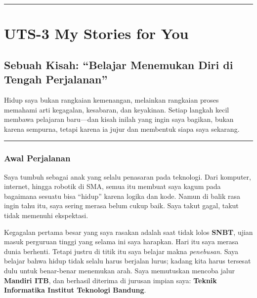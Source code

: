 \documentclass[
  letterpaper,
  DIV=11,
  numbers=noendperiod]{scrreprt}
\begin{document}
\begin{center}\rule{0.5\linewidth}{0.5pt}\end{center}


\chapter{UTS-3 My Stories for You}\label{uts-3-my-stories-for-you}

\section{\texorpdfstring{\textbf{Sebuah Kisah: ``Belajar Menemukan Diri
di Tengah
Perjalanan''}}{Sebuah Kisah: ``Belajar Menemukan Diri di Tengah Perjalanan''}}\label{sebuah-kisah-belajar-menemukan-diri-di-tengah-perjalanan}

Hidup saya bukan rangkaian kemenangan, melainkan rangkaian proses
memahami arti kegagalan, kesabaran, dan keyakinan. Setiap langkah kecil
membawa pelajaran baru---dan kisah inilah yang ingin saya bagikan, bukan
karena sempurna, tetapi karena ia jujur dan membentuk siapa saya
sekarang.

\begin{center}\rule{0.5\linewidth}{0.5pt}\end{center}

\subsection{\texorpdfstring{\textbf{Awal
Perjalanan}}{Awal Perjalanan}}\label{awal-perjalanan}

Saya tumbuh sebagai anak yang selalu penasaran pada teknologi. Dari
komputer, internet, hingga robotik di SMA, semua itu membuat saya kagum
pada bagaimana sesuatu bisa ``hidup'' karena logika dan kode. Namun di
balik rasa ingin tahu itu, saya sering merasa belum cukup baik. Saya
takut gagal, takut tidak memenuhi ekspektasi.

Kegagalan pertama besar yang saya rasakan adalah saat tidak lolos
\textbf{SNBT}, ujian masuk perguruan tinggi yang selama ini saya
harapkan. Hari itu saya merasa dunia berhenti. Tetapi justru di titik
itu saya belajar makna \emph{penebusan}. Saya belajar bahwa hidup tidak
selalu harus berjalan lurus; kadang kita harus tersesat dulu untuk
benar-benar menemukan arah. Saya memutuskan mencoba jalur
\textbf{Mandiri ITB}, dan berhasil diterima di jurusan impian saya:
\textbf{Teknik Informatika Institut Teknologi Bandung}.
\end{document}
